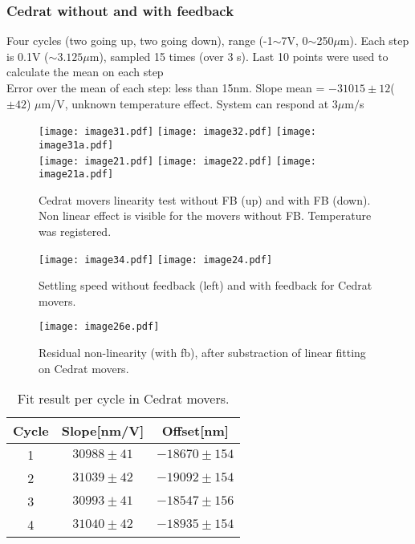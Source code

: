 \subsubsection{Cedrat without and with feedback}
Four cycles (two going up, two going down), range (-1$\sim$7V, 0$\sim$250$\mu$m). Each step is 0.1V ($\sim3.125\mu$m), sampled 15 times (over 3 s). Last 10 points were used to calculate the mean on each step\\Error over the mean of each step: less than 15nm. Slope mean = $-31015\pm12$($\pm42$) $\mu$m/V, unknown temperature effect. System can respond at 3$\mu$m$/$s\par
\begin{figure}
\begin{center}
\texttt{[image: image31.pdf]}
\texttt{[image: image32.pdf]}
\texttt{[image: image31a.pdf]}\\
\texttt{[image: image21.pdf]}
\texttt{[image: image22.pdf]}
\texttt{[image: image21a.pdf]}\caption{Cedrat movers linearity test without FB (up) and with FB (down). Non linear effect is visible for the movers without FB. Temperature was registered.}\label{f-Cedratlinearity}
\end{center}
\end{figure}
\begin{figure}
\begin{center}
 \texttt{[image: image34.pdf]}
 \texttt{[image: image24.pdf]}\caption{Settling speed without feedback (left) and with feedback for Cedrat movers.}\label{f-Cedratstep}
\end{center}
\end{figure}
\begin{figure}
 \begin{center}
\texttt{[image: image26e.pdf]}\caption{Residual non-linearity (with fb), after substraction of linear fitting on Cedrat movers.}\label{f-Cedratlinres}
\end{center}
\end{figure}
\begin{table}
 \begin{center}
\begin{tabular}[]{|c|c|c|}\hline
 Cycle & Slope[nm/V] & Offset[nm] \\\hline
 {\color{red}1} & $30988 \pm 41$& $-18670\pm154$\\
{\color{green}2} & $31039 \pm 42$& $-19092\pm154$ \\
{\color{blue}3} & $30993\pm 41$& $-18547\pm156$\\
{\color{magenta}4} & $31040 \pm42$ & $-18935\pm154$\\\hline
\end{tabular}\caption{Fit result per cycle in Cedrat movers.}\label{t-Cedratslopes}
\end{center}
\end{table}
